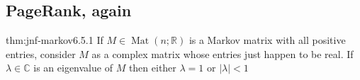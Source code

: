 \documentclass[landscape, 8pt]{extarticle}
\DeclareMathOperator{\Mat}{Mat}
\begin{document}
\begin{multicols}{3}
\subsection{PageRank, again}

\begin{thm}[]{thm:jnf-markov}{6.5.1}
    If $M\in \Mat(n ; \mathbb{R})$ is a Markov matrix with all positive entries, consider $M$ as a complex matrix whose entries just happen to be real. If $\lambda\in \mathbb{C}$ is an eigenvalue of $M$ then either $\lambda = 1$ or $\lvert \lambda \rvert < 1$
\end{thm}

\lipsum[1-2]

\end{multicols}
\end{document}
